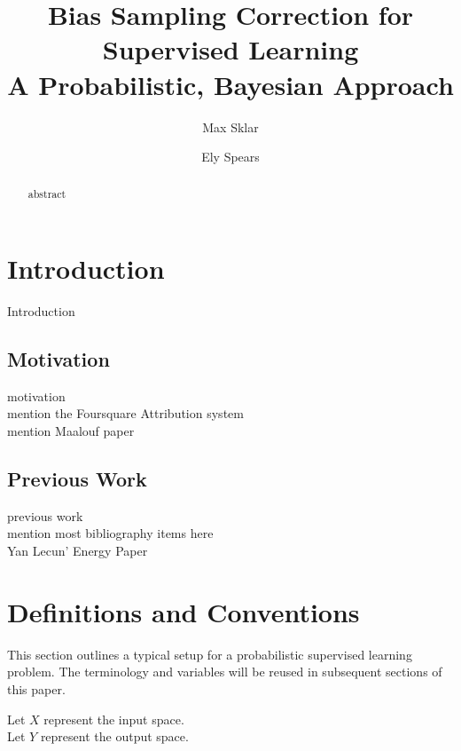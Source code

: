 \documentclass[twoside]{article}
\begin{document}
\parindent=0in
\parskip=12pt

%
%
%
%

\title{
  Bias Sampling Correction for Supervised Learning \\
  \large{
    A  Probabilistic, Bayesian Approach
  }
}

\author{Max Sklar\\
\and
Ely Spears
}

\maketitle
\thispagestyle{empty}

\begin{abstract}
abstract
\end{abstract}

\section{Introduction}

Introduction

\subsection{Motivation}

motivation \\
mention the Foursquare Attribution system \\
mention Maalouf paper

\subsection{Previous Work}

previous work \\
mention most bibliography items here \\
Yan Lecun' Energy Paper \\


\section{Definitions and Conventions}

This section outlines a typical setup for a probabilistic supervised learning problem. The terminology and variables will be reused in subsequent sections of this paper.

Let \(X\) represent the input space. \\
Let \(Y\) represent the output space.
\end{document}
